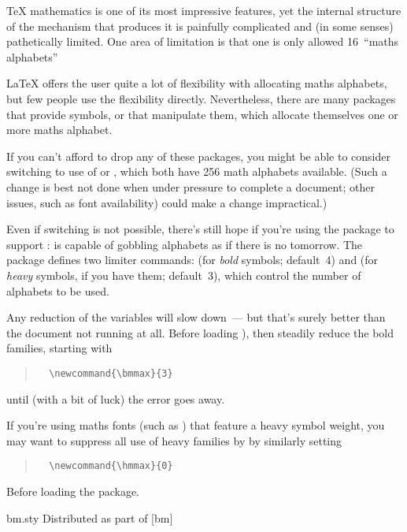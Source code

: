 {\TeX{} mathematics is one of its most impressive features, yet the
internal structure of the mechanism that produces it is painfully
complicated and (in some senses) pathetically limited.  One area of
limitation is that one is only allowed 16~``maths alphabets''

\LaTeX{} offers the user quite a lot of flexibility with allocating
maths alphabets, but few people use the flexibility directly.
Nevertheless, there are many packages that provide symbols, or that
manipulate them, which allocate themselves one or more maths alphabet.

If you can't afford to drop any of these packages, you might be able
to consider switching to use of  or
, which both have 256 math alphabets
available.  (Such a change is best not done when under pressure to
complete a document; other issues, such as font availability) could
make a change impractical.)

Even if switching is not possible, there's still hope if you're using
the  package to support :
 is capable of gobbling alphabets as if there is no
tomorrow.  The package defines two limiter commands:  (for
\emph{bold} symbols; default~4) and  (for \emph{heavy}
symbols, if you have them; default~3), which control the number of
alphabets to be used.

Any reduction of the  variables will slow
 down~--- but that's surely better than the document not
running at all.
Before loading ),  then steadily reduce the bold
families, starting with 
\begin{quote}
\begin{verbatim}
  \newcommand{\bmmax}{3}
\end{verbatim}
\end{quote}
until (with a bit of luck) the error goes away.

If  you're using maths fonts (such as
) that feature a heavy symbol weight,
you may want to suppress all use of heavy families by  by
similarly setting
\begin{quote}
\begin{verbatim}
  \newcommand{\hmmax}{0}
\end{verbatim}
\end{quote}
Before loading the package.

\begin{ctanrefs}
\item[bm.sty]Distributed as part of [bm]
\end{ctanrefs}

}
